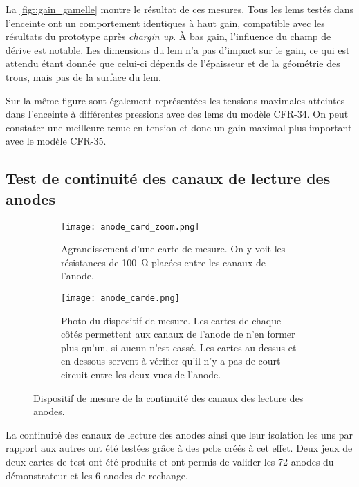       La \autoref{fig::gain_gamelle} montre le résultat de ces mesures. Tous les \glspl{lem} testés dans l'enceinte ont un comportement identiques à haut gain, compatible avec les résultats du prototype \threeL{}\cite{Cantini2014} après \textit{chargin up}. À bas gain, l'influence du champ de dérive est notable. Les dimensions du \gls{lem} n'a pas d'impact sur le gain, ce qui est attendu étant donnée que celui-ci dépends de l'épaisseur et de la géométrie des trous, mais pas de la surface du \gls{lem}.

      Sur la même figure sont également représentées les tensions maximales atteintes dans l'enceinte à différentes pressions avec des \glspl{lem} du modèle CFR-34. On peut constater une meilleure tenue en tension et donc un gain maximal plus important avec le modèle CFR-35.
        
    \subsection{Test de continuité des canaux de lecture des anodes}\label{sec::test_anode}

      \begin{figure}
        \begin{subfigure}[t]{0.48\textwidth}
          \texttt{[image: anode\_card\_zoom.png]}
          \caption{\label{fig::anode_card_zoom}Agrandissement d'une carte de mesure. On y voit les résistances de \SI{100}{\ohm} placées entre les canaux de l'anode.}
        \end{subfigure}
        \hfill
        \begin{subfigure}[t]{0.48\textwidth}
          \texttt{[image: anode\_carde.png]}
          \caption{\label{fig::anode_card}Photo du dispositif de mesure. Les cartes de chaque côtés permettent aux  canaux de l'anode de n'en former plus qu'un, si aucun n'est cassé. Les cartes au dessus et en dessous servent à vérifier qu'il n'y a pas de court circuit entre les deux vues de l'anode.}
        \end{subfigure}
        \caption[Dispositif de mesure de la continuité des canaux de lecture des anodes]{\label{fig::test_anode}Dispositif de mesure de la continuité des canaux des lecture des anodes.}
      \end{figure}
      La continuité des canaux de lecture des anodes ainsi que leur isolation les uns par rapport aux autres ont été testées grâce à des \glspl{pcb} créés à cet effet. Deux jeux de deux cartes de test ont été produits et ont permis de valider les 72 anodes du démonstrateur \SSS{} et les 6 anodes de rechange.
      
